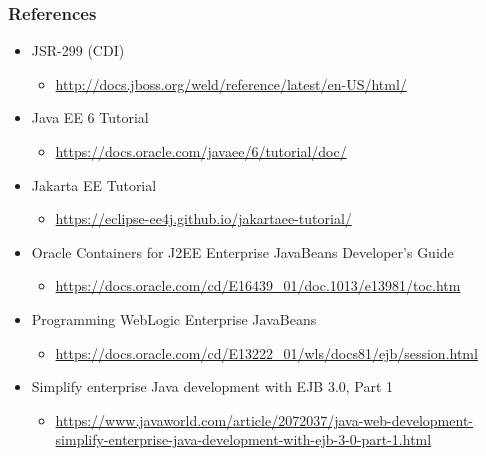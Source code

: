 \documentclass[10pt,xcolor=pdflatex]{beamer}
\begin{document}
\begin{frame}\frametitle{References}
	\begin{itemize}
		\item JSR-299 (CDI)
          \begin{itemize}
        	\item[] {\footnotesize\url{http://docs.jboss.org/weld/reference/latest/en-US/html/}}
          \end{itemize}
		\item Java EE 6 Tutorial
          \begin{itemize}
        	\item[] {\footnotesize\url{https://docs.oracle.com/javaee/6/tutorial/doc/}}
          \end{itemize}
            \item Jakarta EE Tutorial
          \begin{itemize}
              \item \url{https://eclipse-ee4j.github.io/jakartaee-tutorial/}
          \end{itemize}
        \item Oracle\textregistered{} Containers for J2EE Enterprise JavaBeans Developer's Guide
          \begin{itemize}
            \item[] {\footnotesize\url{https://docs.oracle.com/cd/E16439_01/doc.1013/e13981/toc.htm}}
          \end{itemize}
        \item Programming WebLogic Enterprise JavaBeans
          \begin{itemize}
            \item[] {\footnotesize\url{https://docs.oracle.com/cd/E13222_01/wls/docs81/ejb/session.html}}
          \end{itemize}
        \item Simplify enterprise Java development with EJB 3.0, Part 1
          \begin{itemize}
            \item[] {\footnotesize\url{https://www.javaworld.com/article/2072037/java-web-development-simplify-enterprise-java-development-with-ejb-3-0-part-1.html}}
          \end{itemize}
	\end{itemize}
\end{frame}
\end{document}
